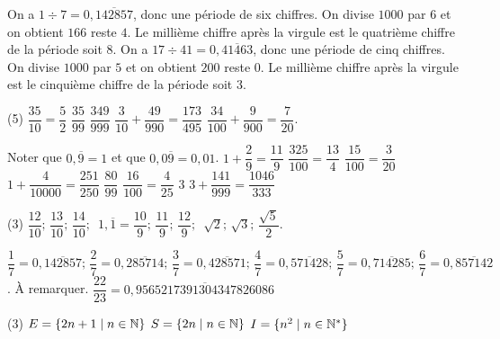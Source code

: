 \documentclass[a4paper,12pt]{report}
\begin{document}
\vspace*{-2\baselineskip}
\begin{core}
	\phantom{.}
	\begin{tasks}
		\task On a $1\div 7=0,\overline{142857}$, donc une période de six chiffres. On divise $1000$ par $6$ et on obtient $166$ reste $4$. Le millième chiffre après la virgule est le quatrième chiffre de la période soit $8$. 
		\task On a $17\div 41=0,\overline{41463}$, donc une période de cinq chiffres. On divise $1000$ par $5$ et on obtient $200$ reste $0$. Le millième chiffre après la virgule est le cinquième chiffre de la période soit $3$. 
	\end{tasks}
\end{core}
\begin{core}
	\phantom{.}
\begin{tasks}(5)
	\task $\dfrac{35}{10}=\dfrac{5}{2}$
	\task $\dfrac{35}{99}$
	\task $\dfrac{349}{999}$
	\task $\dfrac{3}{10}+\dfrac{49}{990}=\dfrac{173}{495}$
	\task $\dfrac{34}{100}+\dfrac{9}{900}=\dfrac{7}{20}$. 

	Noter que $0,\overline{9}=1$ et que $0,0\overline{9}=0,01$.
	\task $1+\dfrac{2}{9}=\dfrac{11}{9}$
	\task $\dfrac{325}{100}=\dfrac{13}{4}$
	\task $\dfrac{15}{100}=\dfrac{3}{20}$
	\task $1+\dfrac{4}{10000}=\dfrac{251}{250}$
	\task $\dfrac{80}{99}$
	\task $\dfrac{16}{100}=\dfrac{4}{25}$
	\task $3$
	\task $3+\dfrac{141}{999}=\dfrac{1046}{333}$
\end{tasks}
\end{core}
\begin{core}
	\phantom{.}
	\begin{tasks}(3)
		\task $\dfrac{12}{10};\, \dfrac{13}{10};\,\dfrac{14}{10};\,$
		\task $1,\overline{1}=\dfrac{10}{9};\, \dfrac{11}{9};\, \dfrac{12}{9};\,$
		\task $\sqrt{2};\, \sqrt{3};\, \dfrac{\sqrt{5}}{2}.$	
	\end{tasks}
\end{core}
\begin{core}
	\phantom{.}
	\begin{tasks}
		\task $\dfrac{1}{7}=0,\overline{142857};\,\dfrac{2}{7}=0,\overline{285714};\,\dfrac{3}{7}=0,\overline{428571};\,\dfrac{4}{7}=0,\overline{571428};\,\dfrac{5}{7}=0,\overline{714285};\,\dfrac{6}{7}=0,\overline{857142}$.
		\task À remarquer.
		\task $\dfrac{22}{23}=0,\overline{9565217391304347826086}$
	\end{tasks}
\end{core}
\begin{core}
	\phantom{.}
	\begin{tasks}(3)
		\task $E=\{2n+1 \mid n\in \mathbb N\}$
		\task $S=\{2n \mid n\in \mathbb N\}$
		\task $I=\{n^2 \mid n\in \mathbb N^*\}$
	\end{tasks}
\end{core}
\end{document}

